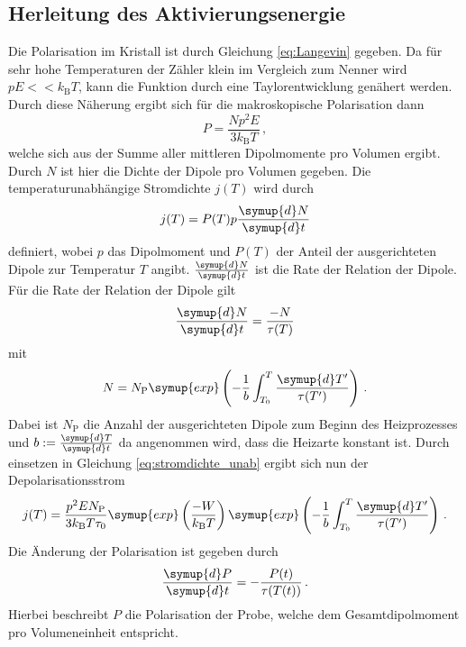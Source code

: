 \subsection{Herleitung des Aktivierungsenergie}
\label{sec:polarisationsansatz}
Die Polarisation im Kristall ist durch Gleichung \eqref{eq:Langevin} gegeben.
Da für sehr hohe Temperaturen der Zähler klein im Vergleich zum Nenner wird $pE << k_\text{B} T$, kann die Funktion durch eine Taylorentwicklung genähert werden.
Durch diese Näherung ergibt sich für die makroskopische Polarisation dann
\begin{equation}
    P = \frac{Np^2E}{3 k_\text{B}T} \, ,
    \label{eq:langevin2}
\end{equation}
welche sich aus der Summe aller mittleren Dipolmomente pro Volumen ergibt.
Durch $N$ ist hier die Dichte der Dipole pro Volumen gegeben.
Die temperaturunabhängige Stromdichte $j(T)$ wird durch
\begin{equation}
    j(T) = P(T)p \frac{\symup{d}N}{\symup{d}t}
    \label{eq:stromdichte_unab}
\end{equation}
definiert, wobei $p$ das Dipolmoment und $P(T)$ der Anteil der ausgerichteten Dipole zur Temperatur $T$ angibt.
$\frac{\symup{d}N}{\symup{d}t}$ ist die Rate der Relation der Dipole.
Für die Rate der Relation der Dipole gilt
\begin{equation}
    \frac{\symup{d}N}{\symup{d}t} = \frac{-N}{\tau(T)}
\end{equation}
mit 
\begin{equation}
    N = N_\text{P} \symup{exp}\left (-\frac{1}{b} \int_{T_0}^{T} \frac{\symup{d}T'}{\tau(T')} \right ) \, .
\end{equation}
Dabei ist $N_\text{P}$ die Anzahl der ausgerichteten Dipole zum Beginn des Heizprozesses und $b := \frac{\symup{d}T}{\symup{d}t}$ da angenommen wird, dass die Heizarte konstant ist.
Durch einsetzen in Gleichung \eqref{eq:stromdichte_unab} ergibt sich nun der Depolarisationsstrom
\begin{equation}
    j(T) = \frac{p^2EN_\text{P}}{3 k_\text{B}T\tau_0} \symup{exp}\left (\frac{-W}{k_\text{B}T} \right ) \symup{exp} \left (-\frac{1}{b} \int_{T_0}^{T} \frac{\symup{d}T'}{\tau(T')}\right ) \, .
\end{equation}
Die Änderung der Polarisation ist gegeben durch
\begin{equation*}
    \frac{\symup{d}P}{\symup{d}t}=-\frac{P(t)}{\tau(T(t))} \, .
\end{equation*}
Hierbei beschreibt $P$ die Polarisation der Probe, welche dem Gesamtdipolmoment pro Volumeneinheit entspricht.
